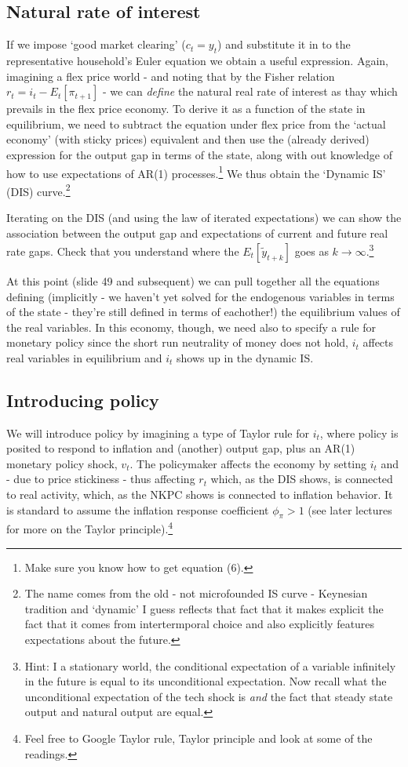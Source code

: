 \documentclass[authoryear,11pt]{elsarticle}
\begin{document}
\subsection{Natural rate of interest}
If we impose `good market clearing' ($c_{t} = y_{t}$) and substitute it in to the representative household's Euler equation we obtain a useful expression. Again, imagining a flex price world - and noting that by the Fisher relation $r_{t}=i_{t}-E_{t}[\pi_{t+1}]$ - we can \textit{define} the natural real rate of interest as thay which prevails in the flex price economy. To derive it as a function of the state in equilibrium, we need to subtract the equation under flex price  from the `actual economy' (with sticky prices) equivalent and then use the (already derived) expression for the output gap in terms of the state, along with out knowledge of how to use expectations of AR(1) processes.\footnote{Make sure you know how to get equation (6).} We thus obtain the `Dynamic IS' (DIS) curve.\footnote{The name comes from the old - not microfounded IS curve - Keynesian tradition and `dynamic' I guess reflects that fact that it makes explicit the fact that it comes from intertermporal choice and also explicitly features expectations about the future.}

Iterating on the DIS (and using the law of iterated expectations) we can show the association between the output gap and expectations of current and future real rate gaps. Check that you understand where the $E_{t}[\tilde{y}_{t+k}]$ goes as $k \rightarrow \infty$.\footnote{Hint: I a stationary world, the conditional expectation of a variable infinitely in the future is equal to its unconditional expectation. Now recall what the unconditional expectation of the tech shock is \textit{and} the fact that steady state output and natural output are equal.}

At this point (slide 49 and subsequent) we can pull together all the equations defining (implicitly - we haven't yet solved for the endogenous variables in terms of the state - they're still defined in terms of eachother!) the equilibrium values of the real variables. In this economy, though, we need also to specify a rule for monetary policy since the short run neutrality of money does not hold, $i_{t}$ affects real variables in equilibrium and $i_{t}$ shows up in the dynamic IS.

\subsection{Introducing policy}
We will introduce policy by imagining a type of Taylor rule for $i_{t}$, where policy is posited to respond to inflation and (another) output gap, plus an AR(1) monetary policy shock, $v_{t}$. The policymaker affects the economy by setting $i_{t}$ and - due to price stickiness - thus affecting $r_{t}$ which, as the DIS shows, is connected to real activity, which, as the NKPC shows is connected to inflation behavior. It is standard to assume the inflation response coefficient $\phi_{\pi}>1$ (see later lectures for more on the Taylor principle).\footnote{Feel free to Google Taylor rule, Taylor principle and look at some of the readings.}
\end{document}
